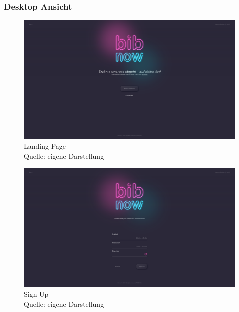 \documentclass[12pt,titlepage]{article}
\begin{document}
\FloatBarrier

\subsubsection{Desktop Ansicht}

\begin{figure}[hbt!]
\centering
\includegraphics[width=400pt]{screenshots/Screenshot_Desktop1.png}
\caption[Srenshot Landing Page]{Landing Page \\Quelle: eigene Darstellung}
\end{figure}

\begin{figure}[hbt!]
\centering
\includegraphics[width=400pt]{screenshots/Screenshot_Desktop2.png}
\caption[Srenshot Sign Up]{Sign Up \\Quelle: eigene Darstellung}
\end{figure}
\end{document}
